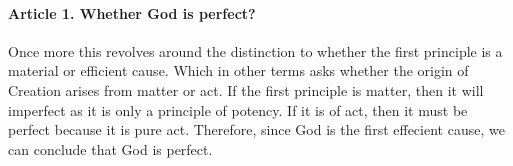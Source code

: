 \documentclass{ucetd}
\begin{document}
\paragraph{Article 1. Whether God is perfect?}
Once more this revolves around the distinction to whether the first principle is a material or efficient cause. Which in other terms asks whether the origin of Creation arises from matter or act. If the first principle is matter, then it will imperfect as it is only a principle of potency. If it is of act, then it must be perfect because it is pure act. Therefore, since God is the first effecient cause, we can conclude that God is perfect.
\end{document}
